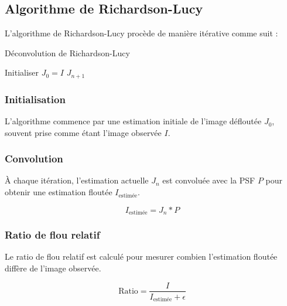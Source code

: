 \subsection{Algorithme de Richardson-Lucy}

L'algorithme de Richardson-Lucy procède de manière itérative comme suit :

\begin{algorithm}[H]
\caption{Déconvolution de Richardson-Lucy}
Initialiser $J_0 = I$\;
\Return $J_{n+1}$\;
\end{algorithm}

\subsubsection{Initialisation}
L'algorithme commence par une estimation initiale de l'image défloutée \( J_0 \), souvent prise comme étant l'image observée \( I \).

\subsubsection{Convolution}
À chaque itération, l'estimation actuelle \( J_n \) est convoluée avec la PSF \( P \) pour obtenir une estimation floutée \( I_{\text{estimée}} \).

\begin{equation}
I_{\text{estimée}} = J_n \ast P
\end{equation}

\subsubsection{Ratio de flou relatif}
Le ratio de flou relatif est calculé pour mesurer combien l'estimation floutée diffère de l'image observée.

\begin{equation}
\text{Ratio} = \frac{I}{I_{\text{estimée}} + \epsilon}
\end{equation}

